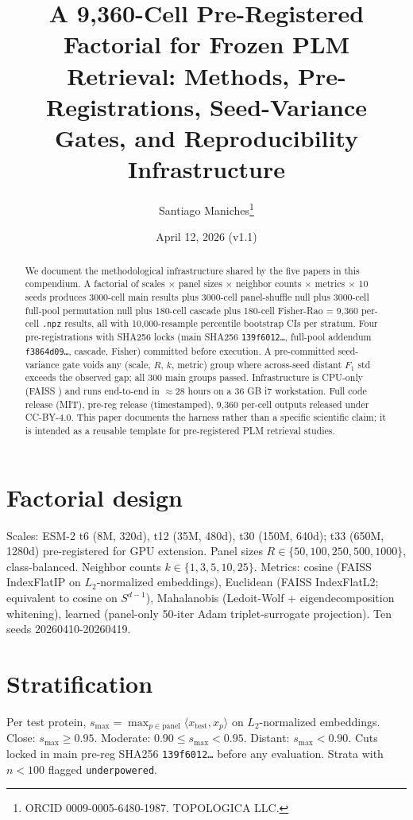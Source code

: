 \documentclass[11pt]{article}
\title{A 9{,}360-Cell Pre-Registered Factorial for Frozen PLM Retrieval: Methods, Pre-Registrations, Seed-Variance Gates, and Reproducibility Infrastructure}
\author{Santiago Maniches\thanks{ORCID 0009-0005-6480-1987. TOPOLOGICA LLC.}}
\date{April 12, 2026 (v1.1)}
\begin{document}
\maketitle
\begin{abstract}
We document the methodological infrastructure shared by the five papers in this compendium. A factorial of scales $\times$ panel sizes $\times$ neighbor counts $\times$ metrics $\times$ 10 seeds produces 3000-cell main results plus 3000-cell panel-shuffle null plus 3000-cell full-pool permutation null plus 180-cell cascade plus 180-cell Fisher-Rao = 9{,}360 per-cell \texttt{.npz} results, all with 10{,}000-resample percentile bootstrap CIs per stratum. Four pre-registrations with SHA256 locks (main SHA256 \texttt{139f6012\ldots}, full-pool addendum \texttt{f3864d09\ldots}, cascade, Fisher) committed before execution. A pre-committed seed-variance gate voids any (scale, $R$, $k$, metric) group where across-seed distant $F_1$ std exceeds the observed gap; all 300 main groups passed. Infrastructure is CPU-only (FAISS \cite{johnson2019billion}) and runs end-to-end in $\approx 28$ hours on a 36 GB i7 workstation. Full code release (MIT), pre-reg release (timestamped), 9{,}360 per-cell outputs released under CC-BY-4.0. This paper documents the harness rather than a specific scientific claim; it is intended as a reusable template for pre-registered PLM retrieval studies.
\end{abstract}

\section{Factorial design}
Scales: ESM-2 \cite{lin2023evolutionary} t6 (8M, 320d), t12 (35M, 480d), t30 (150M, 640d); t33 (650M, 1280d) pre-registered for GPU extension. Panel sizes $R \in \{50, 100, 250, 500, 1000\}$, class-balanced. Neighbor counts $k \in \{1, 3, 5, 10, 25\}$. Metrics: cosine (FAISS IndexFlatIP on $L_2$-normalized embeddings), Euclidean (FAISS IndexFlatL2; equivalent to cosine on $S^{d-1}$), Mahalanobis (Ledoit-Wolf \cite{ledoit2004} + eigendecomposition whitening), learned (panel-only 50-iter Adam triplet-surrogate \cite{schroff2015facenet} projection). Ten seeds 20260410-20260419.

\section{Stratification}
Per test protein, $s_{\max} = \max_{p \in \text{panel}} \langle x_{\text{test}}, x_p \rangle$ on $L_2$-normalized embeddings. Close: $s_{\max} \ge 0.95$. Moderate: $0.90 \le s_{\max} < 0.95$. Distant: $s_{\max} < 0.90$. Cuts locked in main pre-reg SHA256 \texttt{139f6012\ldots} before any evaluation. Strata with $n<100$ flagged \texttt{underpowered}.
\end{document}
